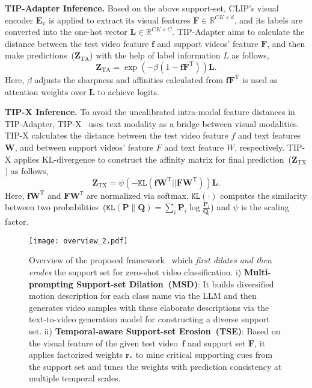 \noindent\textbf{TIP-Adapter Inference.}
Based on the above support-set, CLIP's visual encoder $\bm{E}_\mathrm{v}$ is applied to extract its visual features $\bm{F} \in \mathbb{R}^{CK \times d}$, and its labels are converted into the one-hot vector $ \bm{L} \in \mathbb{R}^{CK \times C}$. TIP-Adapter aims to calculate the distance between the test video feature $\bm{f}$ and support videos' feature $\bm{F}$, and then make predictions~($\bm{Z}_{\mathrm{TA}}$) with the help of label information $L$ as follows,
\begin{equation}
\bm{Z}_{\mathrm{TA}} =\exp (-\beta (1 - \bm{f}\bm{F}^\mathrm{T})) \bm{L}. 
\end{equation}
Here, $\beta$ adjusts the sharpness and affinities calculated from $\bm{f}\bm{F}^\mathrm{T}$ is used as attention weights over $\bm{L}$ to achieve logits.

\noindent\textbf{TIP-X Inference.} To avoid the uncalibrated intra-modal feature distances in TIP-Adapter, TIP-X~\cite{udandarao2022sus-x} uses text modality as a bridge between visual modalities. TIP-X calculates the distance between the test video feature $f$ and text features $\bm{W}$, and between support videos' feature $F$ and text feature $W$, respectively. TIP-X applies KL-divergence to construct the affinity matrix for final prediction~($\bm{Z}_{\mathrm{TX}}$) as follows,
\begin{equation}
\bm{Z}_{\mathrm{TX}}=\psi (-\mathtt{KL}(\bm{f} \bm{W}^\mathrm{T} || \bm{F}\bm{W}^\mathrm{T})) \bm{L}.\label{eq::TIP-X}
\end{equation}
Here, $\bm{f} \bm{W}^\mathrm{T}$ and $\bm{F}\bm{W}^\mathtt{T}$ are normalized via softmax, $\mathtt{KL}(\cdot)$ computes the similarity between two probabilities~($\mathtt{KL}(\bm{P} \parallel \bm{Q}) = \sum_i \bm{P}_i \log \frac{\bm{P}_i}{\bm{Q}_i}$) and $\psi$ is the scaling factor.

\begin{figure*}[t]
  \centering
  \texttt{[image: overview\_2.pdf]}
    \caption{Overview of the proposed framework \testv~which \textit{first dilates and then erodes} the support set for zero-shot video classification.
    i) {\textbf{Multi-prompting Support-set Dilation~(MSD)}}: It builds diversified motion description for each class name via the LLM and then generates video samples with these elaborate descriptions via the text-to-video generation model for constructing a diverse support set. ii) {\textbf{Temporal-aware Support-set Erosion~(TSE)}}: Based on the visual feature of the given test video~{$\bm f$} and support set {$\bm F$}, it applies factorized weights $\bm r_{*}$ to mine critical supporting cues from the support set and tunes the weights with prediction consistency at multiple temporal scales.}\label{fig::overview}
\end{figure*}


